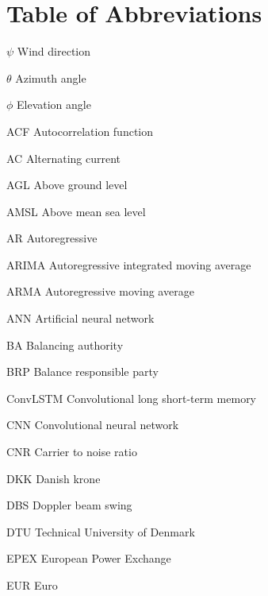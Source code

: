 \chapter{Table of Abbreviations}
\label{sec:abbreviations}


\makeatletter
\newcommand{\tocfill}{\cleaders\hbox{$\m@th \mkern\@dotsep mu . \mkern\@dotsep mu$}\hfill}
\makeatother
\newcommand{\abbrlabel}[1]{\makebox[3cm][l]{\textbf{#1}\ \tocfill}}
\newenvironment{abbreviations}{\begin{list}{}{\renewcommand{\makelabel}{\abbrlabel}%
    \setlength{\labelwidth}{3cm}\setlength{\leftmargin}{\labelwidth+\labelsep}%
        \setlength{\itemsep}{0pt}}}{\end{list}}
\noindent
\bigskip
\begin{abbreviations}
\item[$\psi$] Wind direction
\item[$\theta$] Azimuth angle
\item[$\phi$] Elevation angle

\item[ACF] Autocorrelation function
\item[AC] Alternating current
\item[AGL] Above ground level
\item[AMSL] Above mean sea level
\item[AR] Autoregressive
\item[ARIMA] Autoregressive integrated moving average
\item[ARMA] Autoregressive moving average
\item[ANN] Artificial neural network

\item[BA] Balancing authority
\item[BRP] Balance responsible party

\item[ConvLSTM] Convolutional long short-term memory
\item[CNN] Convolutional neural network
\item[CNR] Carrier to noise ratio

\item[DKK] Danish krone
\item[DBS] Doppler beam swing
\item[DTU] Technical University of Denmark

\item[EPEX] European Power Exchange
\item[EUR] Euro


\end{abbreviations}
